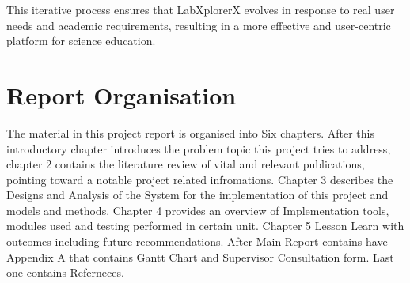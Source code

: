 This iterative process ensures that LabXplorerX evolves in response to real user needs and academic requirements, resulting in a more effective and user-centric platform for science education.
\section{Report Organisation}
The material in this project report is organised into Six chapters. After this introductory chapter introduces the problem topic this project tries to address, chapter 2 contains the literature review of vital and relevant publications, pointing toward a notable project related infromations. Chapter 3 describes the Designs and Analysis of the System for the implementation of this project and models and methods. Chapter 4 provides an overview of Implementation tools, modules used and testing performed in certain unit. Chapter 5 Lesson Learn with outcomes including future recommendations. After Main Report contains have Appendix A that contains Gantt Chart and Supervisor Consultation form. Last one contains Referneces.